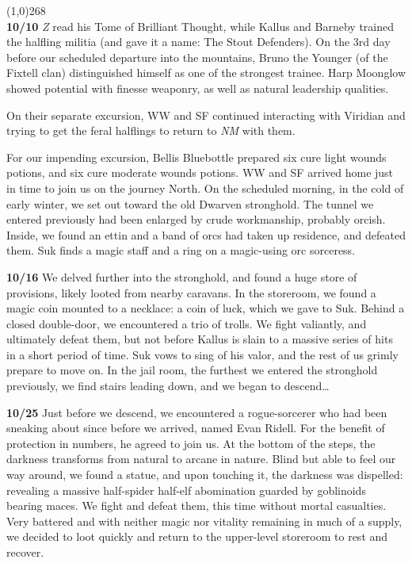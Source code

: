 \documentclass[letterpaper]{article}
\newcommand{\colline}{\noindent\line(1,0){268} \\}
\newcommand{\e}[1]{\emph{#1}}
\newcommand{\B}[1]{\textbf{#1}}
\newenvironment{notesection}[1]
{\noindent {\huge \B{#1}} \par
\vspace{-0.75em}
\colline
\begingroup\fontsize{9pt}{12pt}\selectfont}
{\endgroup}
\begin{document}
\begin{notesection}{Events}
{\color{Red}\B{10/10}} \e{Z} read his Tome of Brilliant Thought, while Kallus and Barneby trained the halfling militia (and gave it a name: The Stout Defenders). On the 3rd day before our scheduled departure into the mountains, Bruno the Younger (of the Fixtell clan) distinguished himself as one of the strongest trainee.  Harp Moonglow showed potential with finesse weaponry, as well as natural leadership qualities.

On their separate excursion, WW and SF continued interacting with Viridian and trying to get the feral halflings to return to \e{NM} with them.

For our impending excursion, Bellis Bluebottle prepared six cure light wounds potions, and six cure moderate wounds potions.  WW and SF arrived home just in time to join us on the journey North.  On the scheduled morning, in the cold of early winter, we set out toward the old Dwarven stronghold.  The tunnel we entered previously had been enlarged by crude workmanship, probably orcish.  Inside, we found an ettin and a band of orcs had taken up residence, and defeated them. Suk finds a magic staff and a ring on a magic-using orc sorceress.

{\color{Red}\B{10/16}} We delved further into the stronghold, and found a huge store of provisions, likely looted from nearby caravans.  In the storeroom, we found a magic coin mounted to a necklace: a coin of luck, which we gave to Suk.  Behind a closed double-door, we encountered a trio of trolls.  We fight valiantly, and ultimately defeat them, but not before Kallus is slain to a massive series of hits in a short period of time. Suk vows to sing of his valor, and the rest of us grimly prepare to move on.  In the jail room, the furthest we entered the stronghold previously, we find stairs leading down, and we began to descend\ldots 

{\color{Red}\B{10/25}} Just before we descend, we encountered a rogue-sorcerer who had been sneaking about since before we arrived, named Evan Ridell. For the benefit of protection in numbers, he agreed to join us.  At the bottom of the steps, the darkness transforms from natural to arcane in nature.  Blind but able to feel our way around, we found a statue, and upon touching it, the darkness was dispelled: revealing a massive half-spider half-elf abomination guarded by goblinoids bearing maces. We fight and defeat them, this time without mortal casualties. Very battered and with neither magic nor vitality remaining in much of a supply, we decided to loot quickly and return to the upper-level storeroom to rest and recover. 


\end{notesection}
\end{document}
